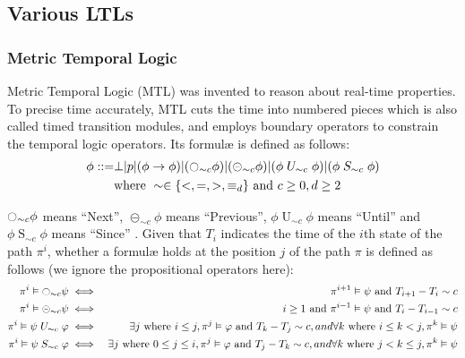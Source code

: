 \subsection{Various LTLs}

\subsubsection{Metric Temporal Logic}

Metric Temporal Logic (MTL) \citep{chang1994compositional} was invented to reason about real-time properties. To precise time accurately, MTL cuts the time into numbered pieces which is also called timed transition modules, and employs boundary operators to constrain the temporal logic operators. Its formul\ae{} is defined as follows:
\begin{align*}
\phi ::= & \bot | p | (\phi \rightarrow \phi) | (\fullmoon_{\sim{}c}\phi) | (\circleddash_{\sim{}c}\phi) | (\phi \mathrel{U}_{\sim{}c} \phi) | (\phi \mathrel{S}_{\sim{}c} \phi) \\
& \mbox{where } \sim \in \{<, =, >, \equiv_d\} \mbox{ and } c \geq 0, d \geq 2
\end{align*}

$\fullmoon_{\sim{}c}\phi$ means ``Next'', $\circleddash_{\sim{}c}\phi$ means ``Previous'', $\phi \mathrel{U}_{\sim{}c} \phi$ means ``Until'' and $\phi \mathrel{S}_{\sim{}c} \phi$ means ``Since'' \citep{chang1994compositional}. Given that $T_i$ indicates the time of the $i$th state of the path $\pi^i$, whether a formul\ae{} holds at the position $j$ of the path $\pi$ is defined as follows (we ignore the propositional operators here):
\begin{eqnarray*}
\pi^i \vDash \fullmoon_{\sim{}c}\psi & \iff & \pi^{i+1} \vDash \psi \mbox{ and } T_{i+1} - T_i \sim c \\
\pi^i \vDash \circleddash_{\sim{}c}\psi & \iff & i \geq 1 \mbox{ and } \pi^{i-1} \vDash \psi \mbox{ and } T_i - T_{i-1} \sim c \\
\pi^i \vDash \psi \mathrel{U}_{\sim{}c} \varphi & \iff & \exists j \mbox{ where } i \leq j, \pi^j \vDash \varphi \mbox{ and } T_k - T_j \sim c, and \forall k \mbox{ where } i \leq k < j, \pi^k \vDash \psi \\
\pi^i \vDash \psi \mathrel{S}_{\sim{}c} \varphi & \iff & \exists j \mbox{ where } 0 \leq j \leq i, \pi^j \vDash \varphi \mbox{ and } T_j - T_k \sim c, and \forall k \mbox{ where } j < k \leq j, \pi^k \vDash \psi \\
\end{eqnarray*}

